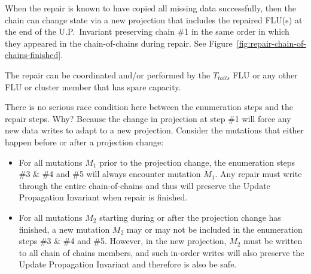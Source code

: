 \documentclass[preprint,10pt]{sigplanconf}
\begin{document}
When the repair is known to have copied all missing data successfully,
then the chain can change state via a new projection that includes the
repaired FLU(s) at the end of the U.P.~Invariant preserving chain \#1
in the same order in which they appeared in the chain-of-chains during
repair.  See Figure~\ref{fig:repair-chain-of-chains-finished}.

The repair can be coordinated and/or performed by the $T_{tails}$ FLU
or any other FLU or cluster member that has spare capacity.

There is no serious race condition here between the enumeration steps
and the repair steps.  Why?  Because the change in projection at
step \#1 will force any new data writes to adapt to a new projection.
Consider the mutations that either happen before or after a projection
change:


\begin{itemize}

\item For all mutations $M_1$ prior to the projection change, the
  enumeration steps \#3 \& \#4 and \#5 will always encounter mutation
  $M_1$.  Any repair must write through the entire chain-of-chains and
  thus will preserve the Update Propagation Invariant when repair is
  finished.

\item For all mutations $M_2$ starting during or after the projection
  change has finished, a new mutation $M_2$ may or may not be included in the
  enumeration steps \#3 \& \#4 and \#5.
  However, in the new projection, $M_2$ must be
  written to all chain of chains members, and such
  in-order writes will also preserve the Update
  Propagation Invariant and therefore is also be safe.

\end{itemize}


\end{document}
